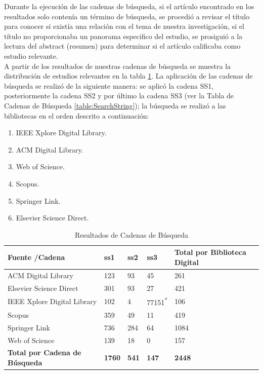 \documentclass{report}
\begin{document}
            Durante la ejecución de las cadenas de búsqueda, si el artículo encontrado en los resultados solo contenía un término de búsqueda, se procedió a revisar el título para conocer si existía una relación con el tema de nuestra investigación, si el título no proporcionaba un panorama especifico del estudio, se prosiguió a la lectura del abstract (resumen) para determinar si el artículo calificaba como estudio relevante.\\
            A partir de los resultados de nuestras cadenas de búsqueda se muestra la distribución de estudios relevantes en la tabla \ref{table:ResultsSearchString}. La aplicación de las cadenas de búsqueda se realizó de la siguiente manera: se aplicó la cadena SS1, posteriormente la cadena SS2 y por último la cadena SS3 (ver la Tabla de Cadenas de Búsqueda \ref{table:SearchString}); la búsqueda se realizó a las bibliotecas en el orden descrito a continuación:
            \begin{enumerate}\label{jerarquiaBD}
                \item IEEE Xplore Digital Library.
                \item ACM Digital Library.
                \item Web of Science.
                \item Scopus.
                \item Springer Link.
                \item Elsevier Science Direct.
            \end{enumerate}
            \begin{table}
                \begin{center}
                    \caption{Resultados de Cadenas de Búsqueda}
                    \label{table:ResultsSearchString}
                    \begin{tabular}{| p{6cm} | p{1cm} | p{1cm} | p{1cm} | p{4cm} |}
                        \toprule
                        \hline
                        \textbf{Fuente /Cadena} & \textbf{ss1} & \textbf{ss2} & \textbf{ss3} & \textbf{Total por Biblioteca Digital}\\ \hline
                        ACM Digital Library & 123 & 93 & 45 & 261\\ \hline
                        Elsevier Science Direct & 301 & 93 & 27 & 421\\ \hline
                        IEEE Xplore Digital Library & 102 & 4 & 77151\textsuperscript{*} & 106\\ \hline
                        Scopus & 359 & 49 & 11 & 419\\ \hline
                        Springer Link & 736 & 284 & 64 &  1084\\ \hline
                        Web of Science & 139 & 18 & 0 & 157\\ \hline
                        \textbf{Total por Cadena de Búsqueda} & \textbf{1760} & \textbf{541} & \textbf{147} & \textbf{2448}\\ \hline
                    \end{tabular}
                \end{center}
            \end{table}
\end{document}
